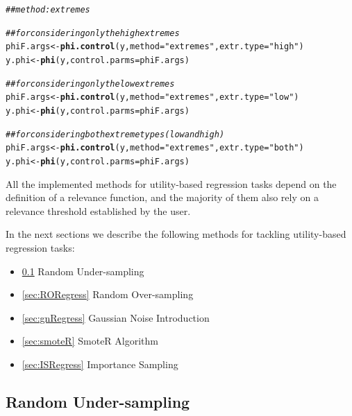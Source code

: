 \documentclass[10pt,a4paper]{article}\usepackage[]{graphicx}\usepackage[]{color}
\makeatletter
\newcommand{\hlstr}[1]{\textcolor[rgb]{0.192,0.494,0.8}{#1}}%
\newcommand{\hlcom}[1]{\textcolor[rgb]{0.678,0.584,0.686}{\textit{#1}}}%
\newcommand{\hlstd}[1]{\textcolor[rgb]{0.345,0.345,0.345}{#1}}%
\newcommand{\hlkwb}[1]{\textcolor[rgb]{0.69,0.353,0.396}{#1}}%
\newcommand{\hlkwc}[1]{\textcolor[rgb]{0.333,0.667,0.333}{#1}}%
\newcommand{\hlkwd}[1]{\textcolor[rgb]{0.737,0.353,0.396}{\textbf{#1}}}%
\newenvironment{kframe}{%
 \def\at@end@of@kframe{}%
 \ifinner\ifhmode%
  \def\at@end@of@kframe{\end{minipage}}%
  \begin{minipage}{\columnwidth}%
 \fi\fi%
 \def\FrameCommand##1{\hskip\@totalleftmargin \hskip-\fboxsep
 \colorbox{shadecolor}{##1}\hskip-\fboxsep
     \hskip-\linewidth \hskip-\@totalleftmargin \hskip\columnwidth}%
 \MakeFramed {\advance\hsize-\width
   \@totalleftmargin\z@ \linewidth\hsize
   \@setminipage}}%
 {\par\unskip\endMakeFramed%
 \at@end@of@kframe}
\newenvironment{knitrout}{}{} %
\makeatother
\begin{document}
\begin{knitrout}\footnotesize
{}\color{fgcolor}\begin{kframe}
\begin{alltt}
\hlcom{## method: extremes}

\hlcom{## for considering only the high extremes}
\hlstd{phiF.args} \hlkwb{<-} \hlkwd{phi.control}\hlstd{(y,}\hlkwc{method}\hlstd{=}\hlstr{"extremes"}\hlstd{,}\hlkwc{extr.type}\hlstd{=}\hlstr{"high"}\hlstd{)}
\hlstd{y.phi} \hlkwb{<-} \hlkwd{phi}\hlstd{(y,}\hlkwc{control.parms}\hlstd{=phiF.args)}

\hlcom{## for considering only the low extremes}
\hlstd{phiF.args} \hlkwb{<-} \hlkwd{phi.control}\hlstd{(y,}\hlkwc{method}\hlstd{=}\hlstr{"extremes"}\hlstd{,}\hlkwc{extr.type}\hlstd{=}\hlstr{"low"}\hlstd{)}
\hlstd{y.phi} \hlkwb{<-} \hlkwd{phi}\hlstd{(y,}\hlkwc{control.parms}\hlstd{=phiF.args)}

\hlcom{## for considering both extreme types (low and high)}
\hlstd{phiF.args} \hlkwb{<-} \hlkwd{phi.control}\hlstd{(y,}\hlkwc{method}\hlstd{=}\hlstr{"extremes"}\hlstd{,}\hlkwc{extr.type}\hlstd{=}\hlstr{"both"}\hlstd{)}
\hlstd{y.phi} \hlkwb{<-} \hlkwd{phi}\hlstd{(y,}\hlkwc{control.parms}\hlstd{=phiF.args)}
\end{alltt}
\end{kframe}
\end{knitrout}

All the implemented methods for utility-based regression tasks depend on the definition of a relevance function, and the majority of them also rely on a relevance threshold established by the user.

In the next sections we describe the following methods for tackling utility-based regression tasks:
\begin{itemize}
\item \ref{sec:RURegress} Random Under-sampling
\item \ref{sec:RORegress} Random Over-sampling
\item \ref{sec:gnRegress} Gaussian Noise Introduction
\item \ref{sec:smoteR} SmoteR Algorithm
\item \ref{sec:ISRegress} Importance Sampling

\end{itemize}

\subsection{Random Under-sampling}\label{sec:RURegress}
\end{document}
